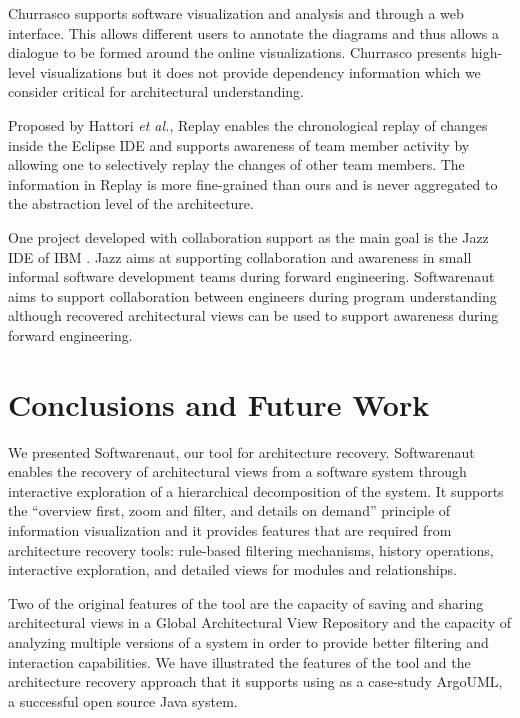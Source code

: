\documentclass[preprint,12pt]{elsarticle}
\newcommand{\etal}{\emph{et al.}\xspace}
\begin{document}
Churrasco \cite{dambros-churrasco} supports software visualization and analysis and through a web interface. This allows different users to annotate the diagrams and thus allows a dialogue to be formed around the online visualizations. Churrasco presents high-level visualizations but it does not provide dependency information which we consider critical for architectural understanding. 

Proposed by Hattori \etal, Replay \cite{hattori-replay} enables the chronological replay of changes inside the Eclipse IDE and supports awareness of team member activity by allowing one to selectively replay the changes of other team members. The information in Replay is more fine-grained than ours and is never aggregated to the abstraction level of the architecture. 


One project developed with collaboration support as the main goal is the Jazz IDE of IBM \cite{hupfer-jazz}. Jazz aims at supporting collaboration and awareness in small informal software development teams during forward engineering. Softwarenaut aims to support collaboration between engineers during program understanding although recovered architectural views can be used to support awareness during forward engineering. %

\section {Conclusions and Future Work} \label {sec:conc}

We presented Softwarenaut, our tool for architecture recovery. Softwarenaut enables the recovery of architectural views from a software system through interactive exploration of a hierarchical decomposition of the system. It supports the ``overview first, zoom and filter, and details on demand'' principle of information visualization and it provides features that are required from architecture recovery tools: rule-based filtering mechanisms, history operations, interactive exploration, and detailed views for modules and relationships. 

Two of the original features of the tool are the capacity of saving and sharing architectural views in a Global Architectural View Repository and the capacity of analyzing multiple versions of a system in order to provide better filtering and interaction capabilities. We have illustrated the features of the tool and the architecture recovery approach that it supports using as a case-study ArgoUML, a successful open source Java system. 
\end{document}
